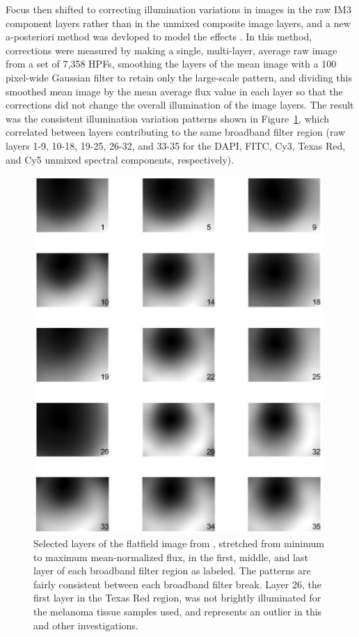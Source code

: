 \documentclass[letterpaper,11pt]{article}
\newcommand{\reffig}[1]{Figure~\ref{#1}}
\begin{document}
Focus then shifted to correcting illumination variations in images in the raw IM3 component layers rather than in the unmixed composite image layers, and a new a-posteriori method was devloped to model the effects \cite{Alex_flatfielding_2}. In this method, corrections were measured by making a single, multi-layer, average raw image from a set of 7,358 HPFs, smoothing the layers of the mean image with a 100 pixel-wide Gaussian filter to retain only the large-scale pattern, and dividing this smoothed mean image by the mean average flux value in each layer so that the corrections did not change the overall illumination of the image layers. The result was the consistent illumination variation patterns shown in \reffig{fig:second_flatfielding}, which correlated between layers contributing to the same broadband filter region (raw layers 1-9, 10-18, 19-25, 26-32, and 33-35 for the DAPI, FITC, Cy3, Texas Red, and Cy5 unmixed spectral components, respectively).

\begin{figure}[!ht]
\centering
\includegraphics[width=0.98\textwidth]{images/introduction/second_flatfield_image_layers}
\caption{\footnotesize Selected layers of the flatfield image from \cite{Alex_flatfielding_2}, stretched from minimum to maximum mean-normalized flux, in the first, middle, and last layer of each broadband filter region as labeled. The patterns are fairly consistent between each broadband filter break. Layer 26, the first layer in the Texas Red region, was not brightly illuminated for the melanoma tissue samples used, and represents an outlier in this and other investigations.}
\label{fig:second_flatfielding}
\end{figure}
\end{document}
